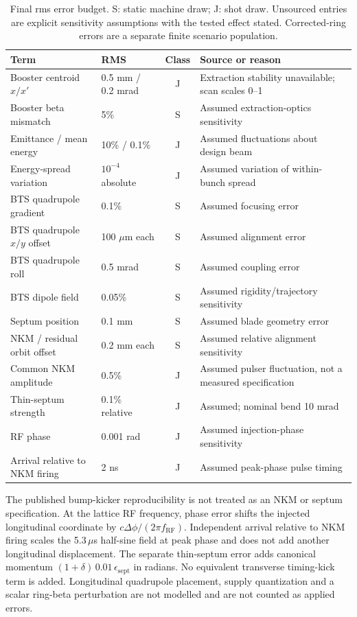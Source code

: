 \documentclass[aps,prab,reprint,amsmath,amssymb,floatfix,longbibliography]{revtex4-2}
\begin{document}
\begin{table}[!tbp]
\centering\small
\caption{Final rms error budget. S: static machine draw; J: shot draw. Unsourced entries are explicit sensitivity assumptions with the tested effect stated. Corrected-ring errors are a separate finite scenario population.}
\label{tab:errors}
\begin{tabular}{@{}lp{3.3cm}cp{5.3cm}@{}}\toprule
Term & RMS & Class & Source or reason \\\midrule
Booster centroid $x/x'$ & 0.5 mm / 0.2 mrad & J & Extraction stability unavailable; scan scales 0--1 \\
Booster beta mismatch & 5\% & S & Assumed extraction-optics sensitivity \\
Emittance / mean energy & 10\% / 0.1\% & J & Assumed fluctuations about design beam \\
Energy-spread variation & $10^{-4}$ absolute & J & Assumed variation of within-bunch spread \\
BTS quadrupole gradient & 0.1\% & S & Assumed focusing error \\
BTS quadrupole $x/y$ offset & 100 $\mu$m each & S & Assumed alignment error \\
BTS quadrupole roll & 0.5 mrad & S & Assumed coupling error \\
BTS dipole field & 0.05\% & S & Assumed rigidity/trajectory sensitivity \\
Septum position & 0.1 mm & S & Assumed blade geometry error \\
NKM / residual orbit offset & 0.2 mm each & S & Assumed relative alignment sensitivity \\
Common NKM amplitude & 0.5\% & J & Assumed pulser fluctuation, not a measured specification \\
Thin-septum strength & 0.1\% relative & J & Assumed; nominal bend 10 mrad~\cite{Hahn2024} \\
RF phase & 0.001 rad & J & Assumed injection-phase sensitivity \\
Arrival relative to NKM firing & 2 ns & J & Assumed peak-phase pulse timing \\\bottomrule
\end{tabular}
\end{table}

The published bump-kicker reproducibility is not treated as an NKM or septum specification. At the lattice RF frequency, phase error shifts the injected longitudinal coordinate by $c\Delta\phi/(2\pi f_\mathrm{RF})$. Independent arrival relative to NKM firing scales the 5.3\,$\mu$s half-sine field at peak phase and does not add another longitudinal displacement. The separate thin-septum error adds canonical momentum $(1+\delta)\,0.01\,\epsilon_\mathrm{sept}$ in radians. No equivalent transverse timing-kick term is added. Longitudinal quadrupole placement, supply quantization and a scalar ring-beta perturbation are not modelled and are not counted as applied errors.
\end{document}
